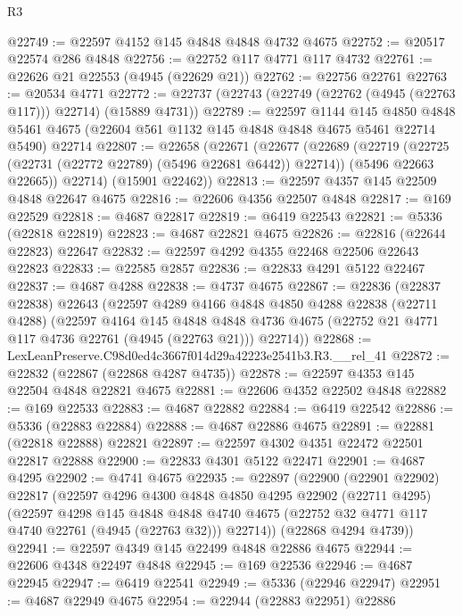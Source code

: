 \begin{lexlean}{R3}
\begin{coremodule}
@22749 := @22597 @4152 @145 @4848 @4848 @4732 @4675
@22752 := @20517 @22574 @286 @4848
@22756 := @22752 @117 @4771 @117 @4732
@22761 := @22626 @21 @22553 (@4945 (@22629 @21))
@22762 := @22756 @22761
@22763 := @20534 @4771
@22772 := @22737 (@22743 (@22749 (@22762 (@4945 (@22763 @117))) @22714) (@15889 @4731))
@22789 := @22597
    @1144
    @145
    @4850
    @4848
    @5461
    @4675
    (@22604 @561 @1132 @145 @4848 @4848 @4675 @5461 @22714 @5490)
    @22714
@22807 := @22658
    (@22671
      (@22677
        (@22689
          (@22719 (@22725 (@22731 (@22772 @22789) (@5496 @22681 @6442)) @22714))
          (@5496 @22663 @22665))
        @22714)
      (@15901 @22462))
@22813 := @22597 @4357 @145 @22509 @4848 @22647 @4675
@22816 := @22606 @4356 @22507 @4848
@22817 := @169 @22529
@22818 := @4687 @22817
@22819 := @6419 @22543
@22821 := @5336 (@22818 @22819)
@22823 := @4687 @22821 @4675
@22826 := @22816 (@22644 @22823) @22647
@22832 := @22597 @4292 @4355 @22468 @22506 @22643 @22823
@22833 := @22585 @2857
@22836 := @22833 @4291 @5122 @22467
@22837 := @4687 @4288
@22838 := @4737 @4675
@22867 := @22836
    (@22837 @22838)
    @22643
    (@22597
      @4289
      @4166
      @4848
      @4850
      @4288
      @22838
      (@22711 @4288)
      (@22597
        @4164
        @145
        @4848
        @4848
        @4736
        @4675
        (@22752 @21 @4771 @117 @4736 @22761 (@4945 (@22763 @21)))
        @22714))
@22868 := LexLeanPreserve.C98d0ed4c3667f014d29a42223e2541b3.R3.__rel_41
@22872 := @22832 (@22867 (@22868 @4287 @4735))
@22878 := @22597 @4353 @145 @22504 @4848 @22821 @4675
@22881 := @22606 @4352 @22502 @4848
@22882 := @169 @22533
@22883 := @4687 @22882
@22884 := @6419 @22542
@22886 := @5336 (@22883 @22884)
@22888 := @4687 @22886 @4675
@22891 := @22881 (@22818 @22888) @22821
@22897 := @22597 @4302 @4351 @22472 @22501 @22817 @22888
@22900 := @22833 @4301 @5122 @22471
@22901 := @4687 @4295
@22902 := @4741 @4675
@22935 := @22897
    (@22900
      (@22901 @22902)
      @22817
      (@22597
        @4296
        @4300
        @4848
        @4850
        @4295
        @22902
        (@22711 @4295)
        (@22597
          @4298
          @145
          @4848
          @4848
          @4740
          @4675
          (@22752 @32 @4771 @117 @4740 @22761 (@4945 (@22763 @32)))
          @22714))
      (@22868 @4294 @4739))
@22941 := @22597 @4349 @145 @22499 @4848 @22886 @4675
@22944 := @22606 @4348 @22497 @4848
@22945 := @169 @22536
@22946 := @4687 @22945
@22947 := @6419 @22541
@22949 := @5336 (@22946 @22947)
@22951 := @4687 @22949 @4675
@22954 := @22944 (@22883 @22951) @22886

\end{coremodule}
\end{lexlean}

